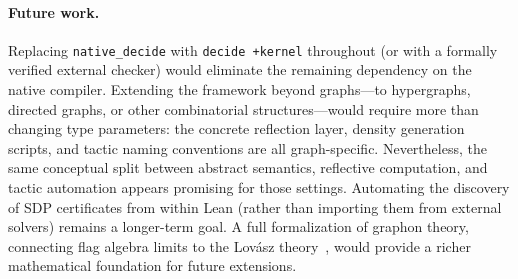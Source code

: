 \documentclass{article}
\newcommand{\lean}[1]{\texttt{#1}}
\begin{document}
\paragraph{Future work.}
Replacing \lean{native\_decide} with \lean{decide +kernel} throughout (or
with a formally verified external checker) would eliminate the remaining
dependency on the native compiler.  Extending the framework beyond graphs---to
hypergraphs, directed graphs, or other combinatorial structures---would require
more than changing type parameters: the concrete reflection layer, density
generation scripts, and tactic naming conventions are all graph-specific.
Nevertheless, the same conceptual split between abstract semantics,
reflective computation, and tactic automation appears promising for those
settings.  Automating the discovery of SDP certificates from within Lean
(rather than importing them from external solvers) remains a longer-term goal.
A full formalization of graphon theory, connecting flag algebra limits to the
Lov\'asz theory~\cite{lovasz2012large}, would provide a richer mathematical
foundation for future extensions.
\end{document}

